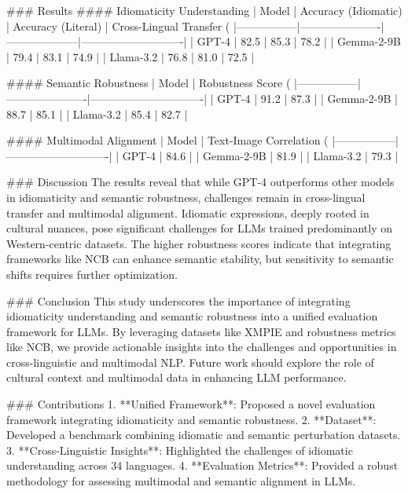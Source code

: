 ### Results
#### Idiomaticity Understanding
| Model          | Accuracy (Idiomatic) | Accuracy (Literal) | Cross-Lingual Transfer (%
|-----------------|----------------------|--------------------|----------------------------|
| GPT-4          | 82.5                | 85.3               | 78.2                       |
| Gemma-2-9B     | 79.4                | 83.1               | 74.9                       |
| Llama-3.2      | 76.8                | 81.0               | 72.5                       |

#### Semantic Robustness
| Model          | Robustness Score (%
|-----------------|----------------------|-------------------------------|
| GPT-4          | 91.2                | 87.3                          |
| Gemma-2-9B     | 88.7                | 85.1                          |
| Llama-3.2      | 85.4                | 82.7                          |

#### Multimodal Alignment
| Model          | Text-Image Correlation (%
|-----------------|----------------------------|
| GPT-4          | 84.6                       |
| Gemma-2-9B     | 81.9                       |
| Llama-3.2      | 79.3                       |

### Discussion
The results reveal that while GPT-4 outperforms other models in idiomaticity and semantic robustness, challenges remain in cross-lingual transfer and multimodal alignment. Idiomatic expressions, deeply rooted in cultural nuances, pose significant challenges for LLMs trained predominantly on Western-centric datasets. The higher robustness scores indicate that integrating frameworks like NCB can enhance semantic stability, but sensitivity to semantic shifts requires further optimization.

### Conclusion
This study underscores the importance of integrating idiomaticity understanding and semantic robustness into a unified evaluation framework for LLMs. By leveraging datasets like XMPIE and robustness metrics like NCB, we provide actionable insights into the challenges and opportunities in cross-linguistic and multimodal NLP. Future work should explore the role of cultural context and multimodal data in enhancing LLM performance.

### Contributions
1. **Unified Framework**: Proposed a novel evaluation framework integrating idiomaticity and semantic robustness.
2. **Dataset**: Developed a benchmark combining idiomatic and semantic perturbation datasets.
3. **Cross-Linguistic Insights**: Highlighted the challenges of idiomatic understanding across 34 languages.
4. **Evaluation Metrics**: Provided a robust methodology for assessing multimodal and semantic alignment in LLMs.